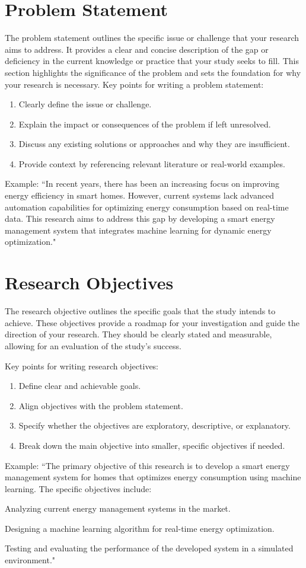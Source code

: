 \section{Problem Statement}
The problem statement outlines the specific issue or challenge that your research aims to address. It provides a clear and concise description of the gap or deficiency in the current knowledge or practice that your study seeks to fill. This section highlights the significance of the problem and sets the foundation for why your research is necessary. Key points for writing a problem statement:
\begin{enumerate}
\item Clearly define the issue or challenge.
\item Explain the impact or consequences of the problem if left unresolved.
\item Discuss any existing solutions or approaches and why they are insufficient.
\item Provide context by referencing relevant literature or real-world examples.
\end{enumerate}
Example: ``In recent years, there has been an increasing focus on improving energy efficiency in smart homes. However, current systems lack advanced automation capabilities for optimizing energy consumption based on real-time data. This research aims to address this gap by developing a smart energy management system that integrates machine learning for dynamic energy optimization."

\section{Research Objectives}
The research objective outlines the specific goals that the study intends to achieve. These objectives provide a roadmap for your investigation and guide the direction of your research. They should be clearly stated and measurable, allowing for an evaluation of the study's success.

Key points for writing research objectives:
\begin{enumerate}
\item Define clear and achievable goals.
\item Align objectives with the problem statement.
\item Specify whether the objectives are exploratory, descriptive, or explanatory.
\item Break down the main objective into smaller, specific objectives if needed.
\end{enumerate}
Example: ``The primary objective of this research is to develop a smart energy management system for homes that optimizes energy consumption using machine learning. The specific objectives include:
\begin{dinglist}{43}
\item Analyzing current energy management systems in the market.
\item Designing a machine learning algorithm for real-time energy optimization.
\item Testing and evaluating the performance of the developed system in a simulated environment."
\end{dinglist}


